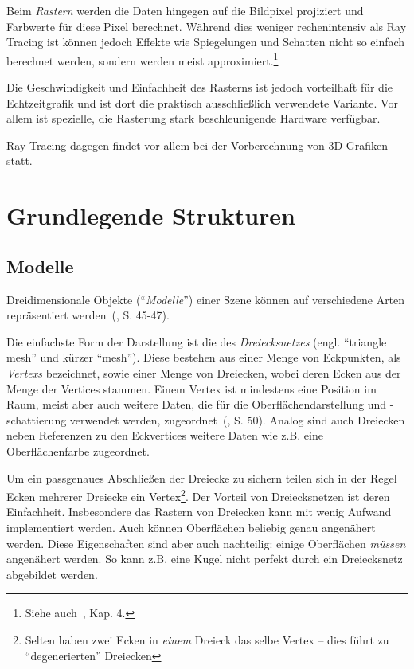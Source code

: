 \documentclass[twoside,a4paper,fleqn,12pt]{book}
\begin{document}
Beim \emph{Rastern} werden die Daten hingegen auf die Bildpixel projiziert und Farbwerte für diese Pixel berechnet.
Während dies weniger rechenintensiv als Ray Tracing ist können jedoch Effekte wie Spiegelungen und Schatten nicht so
einfach berechnet werden, sondern werden meist approximiert.\footnote{Siehe auch~\cite{watt_de}, Kap. 4.}

Die Geschwindigkeit und Einfachheit des Rasterns ist jedoch vorteilhaft für die Echtzeitgrafik und ist dort die praktisch
ausschließlich verwendete Variante. %
Vor allem ist spezielle, die Rasterung stark beschleunigende Hardware verfügbar. %

Ray Tracing dagegen findet vor allem bei der Vorberechnung von 3D-Grafiken statt.

\section{Grundlegende Strukturen}

\subsection{Modelle}
\label{tri_mesh}

Dreidimensionale Objekte ("`\emph{Modelle}"') einer Szene können auf verschiedene Arten repräsentiert werden~(\cite{watt_de}, S. 45-47). 

Die einfachste Form der Darstellung ist die des \emph{\gls{Dreiecksnetz}es} (engl. ``triangle mesh'' und kürzer ``mesh'').
 Diese bestehen aus einer Menge von Eckpunkten,
als \emph{\glspl{Vertex}} bezeichnet, sowie einer Menge von Dreiecken, wobei deren Ecken aus der Menge der Vertices stammen.
Einem Vertex ist mindestens eine Position im Raum, meist aber auch weitere Daten, die für die Oberflächendarstellung und
\mbox{-schattierung} verwendet werden,  zugeordnet~(\cite{watt_de}, S. 50).
Analog sind auch Dreiecken neben Referenzen zu den Eckvertices weitere Daten wie z.B. eine Oberflächenfarbe zugeordnet.


Um ein passgenaues Abschließen der Dreiecke zu sichern teilen sich in der Regel Ecken mehrerer Dreiecke ein
Vertex\footnote{Selten haben zwei Ecken in \emph{einem} Dreieck das selbe Vertex -- dies führt zu "`degenerierten"' Dreiecken}. 
Der Vorteil von Dreiecksnetzen ist deren Einfachheit. Insbesondere das Rastern von Dreiecken kann mit wenig Aufwand
implementiert werden. Auch können Oberflächen beliebig genau angenähert werden. Diese Eigenschaften sind aber auch
nachteilig: einige Oberflächen \emph{müssen} angenähert werden. So kann z.B. eine Kugel nicht perfekt durch ein Dreiecksnetz
abgebildet werden. 
\end{document}
